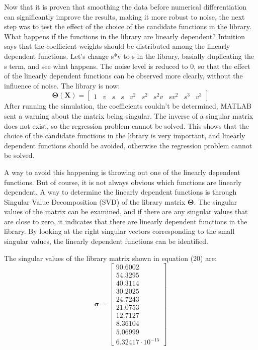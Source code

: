﻿\documentclass[12pt,a4paper]{article}
\begin{document}
Now that it is proven that smoothing the data before numerical differentiation
can significantly improve the results, making it more robust to noise, the 
next step was to test the effect of the choice of the candidate functions in the library.  
What happens if the functions in the library are linearly dependent? Intuition says that
the coefficient weights should be distributed among the linearly dependent functions.
Let's change s*v to s in the library, basially duplicating the s term, and see what happens.
The noise level is reduced to 0, so that the effect of the linearly dependent functions can be
observed more clearly, without the influence of noise.
The library is now:
\begin{equation}
    \bm{\Theta}(\bm{X}) = \begin{bmatrix}
    1 & v & s & s & v^2 & s^2 & s^2v & sv^2 & s^3 & v^3
    \end{bmatrix}
\end{equation}
After running the simulation, the coefficients couldn't be determined,
MATLAB sent a warning about the matrix being singular. The inverse of a singular matrix 
does not exist, so the regression problem cannot be solved. This shows that 
the choice of the candidate functions in the library is very important, and linearly dependent
functions should be avoided, otherwise the regression problem cannot be solved.\par
A way to avoid this happening is throwing out one of the linearly dependent functions. 
But of course, it is not always obvious which functions are linearly dependent.
A way to determine the linearly dependent functions is through Singular Value
Decomposition (SVD) of the library matrix $\bm{\Theta}$. The singular values of the matrix
can be examined, and if there are any singular values that are close to zero, it indicates 
that there are linearly dependent functions in the library. By looking at the right
singular vectors corresponding to the small singular values, the linearly dependent functions
can be identified.\par 
The singular values of the library matrix shown in equation (20) are:
\begin{equation}
    \bm{\sigma} = \begin{bmatrix}
    90.6002 \\
    54.3295 \\
    40.3114 \\
    30.2025 \\
    24.7243 \\
    21.0753 \\
    12.7127 \\
    8.36104 \\
    5.06999 \\
    6.32417\cdot10^{-15}
    \end{bmatrix}
\end{equation}
\end{document}

